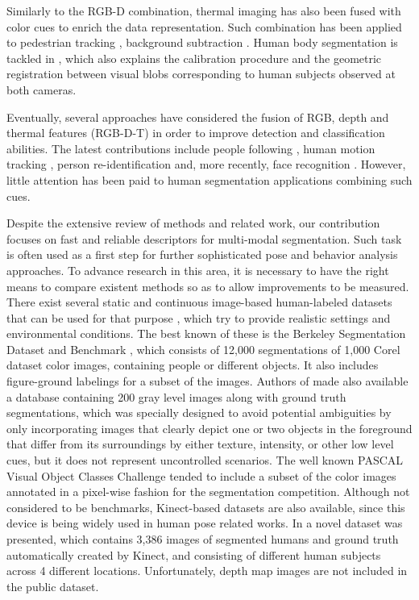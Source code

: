 \documentclass[10pt,twocolumn,letterpaper]{article}
\begin{document}
Similarly to the RGB-D combination, thermal imaging has also been fused with color cues to enrich the data representation. Such combination has been applied to pedestrian tracking \cite{leykin2006robust, leykin2007thermal}, background subtraction \cite{davis2007background}. Human body segmentation is tackled in \cite{zhao2012human}, which also explains the calibration procedure and the geometric registration between visual blobs corresponding to human subjects observed at both cameras. 

Eventually, several approaches have considered the fusion of RGB, depth and thermal features (RGB-D-T) in order to improve detection and classification abilities. The latest contributions include people following \cite{susperregi2013rgb}, human motion tracking \cite{chun2013applications}, person re-identification \cite{mogelmosetri} and, more recently, face recognition \cite{nikisinsrgb}. However, little attention has been paid to human segmentation applications combining such cues.

Despite the extensive review of methods and related work, our contribution focuses on fast and reliable descriptors for multi-modal segmentation. Such task is often used as a first step for further sophisticated pose and behavior analysis approaches. To advance research in this area, it is necessary to have the right means to compare existent methods so as to allow improvements to be measured. There exist several static and continuous image-based human-labeled datasets that can be used for that purpose \cite{moeslund2011visual}, which try to provide realistic settings and environmental conditions. The best known of these is the Berkeley Segmentation Dataset and Benchmark \cite{martin2001database}, which consists of 12,000 segmentations of 1,000 Corel dataset color images, containing people or different objects. It also includes figure-ground labelings for a subset of the images. Authors of \cite{alpert2007} made also available a database containing 200 gray level images along with ground truth segmentations, which was specially designed to avoid potential ambiguities by only incorporating images that clearly depict one or two objects in the foreground that differ from its surroundings by either texture, intensity, or other low level cues, but it does not represent uncontrolled scenarios. The well known PASCAL Visual Object Classes Challenge \cite{everingham2012pascal} tended to include a subset of the color images annotated in a pixel-wise fashion for the segmentation competition. Although not considered to be benchmarks, Kinect-based datasets are also available, since this device is being widely used in human pose related works. In \cite{gulshan2011humanising} a novel dataset was presented, which contains 3,386 images of segmented humans and ground truth automatically created by Kinect, and consisting of different human subjects across 4 different locations. Unfortunately, depth map images are not included in the public dataset. 
\end{document}
